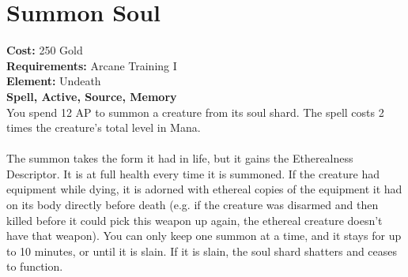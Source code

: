 \section{Summon Soul}
\textbf{Cost:} 250 Gold\\
\textbf{Requirements:} Arcane Training I\\
\textbf{Element:} Undeath\\
\textbf{Spell, Active, Source, Memory}\\
You spend 12 AP to summon a creature from its soul shard. The spell costs 2 times the creature’s total level in Mana.\\
\\
The summon takes the form it had in life, but it gains the Etherealness Descriptor. It is at full health every time it is summoned. If the creature had equipment while dying, it is adorned with ethereal copies of the equipment it had on its body directly before death (e.g. if the creature was disarmed and then killed before it could pick this weapon up again, the ethereal creature doesn’t have that weapon). You can only keep one summon at a time, and it stays for up to 10 minutes, or until it is slain. If it is slain, the soul shard shatters and ceases to function.\\